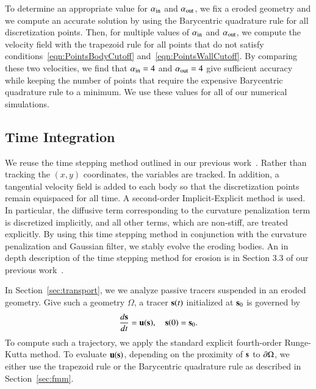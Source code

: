 \documentclass[preprint, 10pt]{elsarticle}
\begin{document}
To determine an appropriate value for $\alpha_\iin$ and $\alpha_\out$,
we fix a eroded geometry and we compute an accurate solution by using
the Barycentric quadrature rule for all discretization points.  Then,
for multiple values of $\alpha_\iin$ and $\alpha_\out$, we compute the
velocity field with the trapezoid rule for all points that do not
satisfy conditions~\eqref{eqn:PointsBodyCutoff}
and~\eqref{eqn:PointsWallCutoff}.  By comparing these two velocities, we
find that $\alpha_\iin = 4$ and $\alpha_\out = 4$ give sufficient
accuracy while keeping the number of points that require the expensive
Barycentric quadrature rule to a minimum.  We use these values for all
of our numerical simulations.




\subsection{Time Integration}
\label{sec:time}
We reuse the time stepping method outlined in our previous
work~\cite{qua-moo2018}.  Rather than tracking the $(x,y)$ coordinates,
the {\thL} variables are tracked. In addition, a tangential velocity
field is added to each body so that the discretization points remain
equispaced for all time.  A second-order Implicit-Explicit method is
used. In particular, the diffusive term corresponding to the curvature
penalization term is discretized implicitly, and all other terms, which
are non-stiff, are treated explicitly.  By using this time stepping
method in conjunction with the curvature penalization and Gaussian
filter, we stably evolve the eroding bodies.   An in depth description
of the time stepping method for erosion is in Section 3.3 of our
previous work~\cite{qua-moo2018}.

In Section~\ref{sec:transport}, we we analyze passive tracers suspended in
an eroded geometry.  Give such a geometry $\Omega$, a tracer $\ss(t)$
initialized at $\ss_0$ is governed by 
\begin{align}
  \label{eqn:trajectories}
  \frac{d\ss}{dt} = \uu(\ss), \quad \ss(0) = \ss_0.
\end{align}
To compute such a trajectory, we apply the standard explicit
fourth-order Runge-Kutta method.  To evaluate $\uu(\ss)$, depending on
the proximity of $\ss$ to $\bd\Omega$, we either use the trapezoid rule
or the Barycentric quadrature rule as described in Section~\ref{sec:fmm}.
\end{document}
